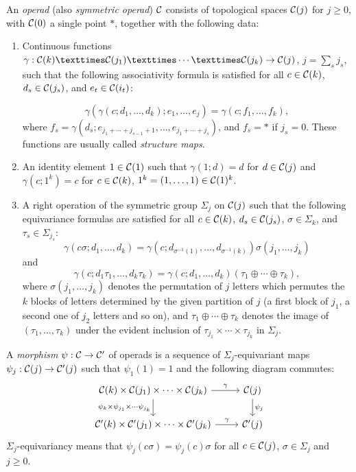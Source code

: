 \documentclass[TFM.tex]{subfiles}
\begin{document}
\begin{defi}\label{operadtop}
An \emph{operad} (also \emph{symmetric operad}) $\mathcal{C}$ consists of topological spaces $\mathcal{C}(j)$ for $j\geq 0$, with $\mathcal{C}(0)$ a single point $*$, together with the following data:
\begin{enumerate}[(1)]
\item Continuous functions $\gamma : \CC(k) × \CC(j_1) × \cdots × \CC(j_k) \to \CC(j)$, $j =\sum_s j_s$, such that the
following associativity formula is satisfied for all $c\in \mathcal{C}(k)$, $d_s \in \mathcal{C}(j_s)$, and $e_t \in \mathcal{C}(i_t)$:

\[\gamma(
\gamma(c; d_1, \dots , d_k); e_1, \dots , e_j) = 
\gamma(c; f_1, \dots , f_k),
\]
where $f_s = \gamma(d_s; e_{j_1+\cdots+j_{s−1}+1}, \dots , e_{j_1+\cdots+j_s} )$, and $f_s = *$ if $j_s = 0$. These functions are usually called \emph{structure maps}.

\item An identity element $1 \in \mathcal{C}(1)$ such that 
$\gamma(1; d) = d$ for $d \in \mathcal{C}(j)$ and 
$\gamma(c; 1^k) = c$ for
$c \in \mathcal{C}(k)$, $1^k = (1, \dots , 1) \in \mathcal{C}(1)^k$.

\item A right operation of the symmetric group $\Sigma_j$ on $\mathcal{C}(j)$ such that the following equivariance
formulas are satisfied for all $c\in \mathcal{C}(k)$, $d_s \in \mathcal{C}(j_s)$, $\sigma\in\Sigma_k$, and $\tau_s\in\Sigma_{j_s}$:
\[
\gamma(c\sigma; d_1, \dots , d_k) = 
\gamma(c; d_{\sigma^{−1}(1)}, \dots , d_{\sigma^{−1}(k)})\sigma(j_1, \dots , j_k)
\]
and 
\[
\gamma(c; d_1\tau_1, \dots , d_k\tau_k) = \gamma(c; d_1, \dots , d_k)(\tau_1\oplus\cdots\oplus\tau_k),
\] 
where $\sigma(j_1, \dots , j_k)$ denotes the
permutation of $j$ letters which permutes the $k$ blocks of letters determined by the given
partition of $j$ (a first block of $j_1$, a second one of $j_2$ letters and so on), and $\tau_1\oplus\cdots\oplus\tau_k$ denotes the image of $(\tau_1, \dots , \tau_k)$ under the evident inclusion of $\tau_{j_1} × \cdots × \tau_{j_k}$ in $\Sigma_j$.
\end{enumerate}
\end{defi}



\begin{defi}
A \emph{morphism} $\psi:\mathcal{C} \to \mathcal{C}'$ of operads is a sequence of $\Sigma_j$-equivariant maps  $\psi_j : \mathcal{C}(j)\to \mathcal{C}'(j)$ such that
 $\psi_1(1) = 1$ and the following diagram commutes:
 \[
 \begin{tikzcd}
\CC(k)\times \CC(j_1)\times\cdots\times \CC(j_k) \arrow[r, "\gamma"] \arrow[d, "\psi_k\times\psi_{j_1}\times\cdots\psi_{j_k}"'] & \CC(j) \arrow[d, "\psi_j"] \\
\CC'(k)\times \CC'(j_1)\times\cdots\times \CC'(j_k) \arrow[r, "\gamma"]                                                         & \CC'(j)                   
\end{tikzcd}\]
$\Sigma_j$-equivariancy means that $\psi_j(c\sigma)=\psi_j(c)\sigma$ for all $c\in \mathcal{C}(j)$, $\sigma\in\Sigma_j$ and $j\geq 0$. 
\end{defi}
\end{document}
